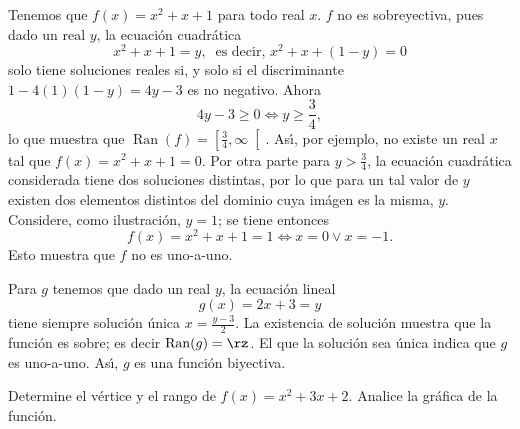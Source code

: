 \begin{sol}
Tenemos que $f(x)=x^{2}+x+1$ para todo real $x$. $f$ no es sobreyectiva, pues
dado un real $y$, la ecuaci\'{o}n cuadr\'{a}tica
\[
x^{2}+x+1=y,\ \mbox{ \ es decir, \ }x^{2}+x+(1-y)=0
\]
solo tiene soluciones reales si, y solo si el discriminante $1-4(1)(1-y)=4y-3$
es no negativo. Ahora
\[
4y-3\geq0\Longleftrightarrow y\geq\frac{3}{4},
\]
lo que muestra que $\operatorname*{Ran}(f)=\left[  \frac{3}{4},\infty\right[
$. As\'{\i}, por ejemplo, no existe un real $x$ tal que $f(x)=x^{2}+x+1=0$.
Por otra parte para $y>\frac{3}{4}$, la ecuaci\'{o}n cuadr\'{a}tica
considerada tiene dos soluciones distintas, por lo que para un tal valor de
$y$ existen dos elementos distintos del dominio cuya im\'{a}gen es la misma,
$y$. Considere, como ilustraci\'{o}n, $y=1$; se tiene entonces
\[
f(x)=x^{2}+x+1=1\Longleftrightarrow x=0\vee x=-1.
\]
Esto muestra que $f$ no es uno-a-uno.

Para $g$ tenemos que dado un real $y$, la ecuaci\'{o}n lineal
\[
g(x)=2x+3=y
\]
tiene siempre soluci\'{o}n \'{u}nica $x=\frac{y-3}{2}$. La existencia de
soluci\'{o}n muestra que la funci\'{o}n es sobre; es decir
$\operatorname*{Ran}(g)=\rz$. El que la soluci\'{o}n sea \'{u}nica indica que
$g$ es uno-a-uno. As\'{\i}, $g$ es una funci\'{o}n biyectiva.
\end{sol}

\begin{example}
Determine el v\'{e}rtice y el rango de $f(x)=x^{2}+3x+2$. Analice la
gr\'{a}fica de la funci\'{o}n.
\end{example}

